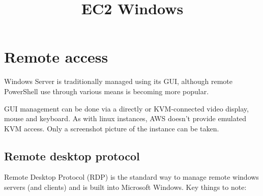 \documentclass{pgnotes}
\title{EC2 Windows}
\begin{document}
\maketitle

\section{Remote access}

Windows Server is traditionally managed using its GUI, although remote
PowerShell use through various means is becoming more popular.

GUI management can be done via a directly or KVM-connected video
display, mouse and keyboard. As with linux instances, AWS doesn't
provide emulated KVM access. Only a screenshot picture of the instance
can be taken.

\subsection{Remote desktop protocol}\label{remote-desktop-protocol}

Remote Desktop Protocol
(RDP) is the standard way to manage remote windows servers (and clients)
and is built into Microsoft Windows. Key things to note:
\end{document}
